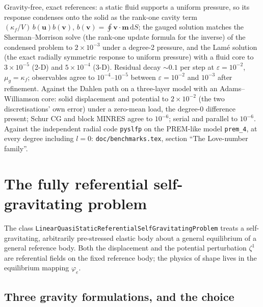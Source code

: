 \documentclass[11pt]{article}
\numberwithin{equation}{section}
\theoremstyle{remark}
\newcommand{\eps}{\varepsilon}
\newcommand{\dS}{\,\mathrm{d}S}
\newcommand{\vu}{\mathbf{u}}
\newcommand{\vv}{\mathbf{v}}
\newcommand{\vm}{\mathbf{m}}
\newcommand{\code}[1]{\texttt{#1}}
\begin{document}
Gravity-free, exact references: a static fluid supports a uniform pressure,
so its response condenses onto the solid as the rank-one cavity term
$(\kappa_f/V)\,b(\vu)b(\vv)$, $b(\vv) = \oint\vv\cdot\vm\dS$; the gauged
solution matches the Sherman--Morrison solve (the rank-one update formula
for the inverse) of the condensed problem to $2\times10^{-3}$ under a
degree-2 pressure, and the Lam\'e solution (the exact radially symmetric
response to uniform pressure) with a
fluid core to $3\times10^{-5}$ (2-D) and $5\times10^{-4}$ (3-D). Residual
decay $\sim0.1$ per step at $\eps = 10^{-2}$, $\mu_g = \kappa_f$;
observables agree to $10^{-4}$--$10^{-5}$ between $\eps = 10^{-2}$ and
$10^{-3}$ after refinement. Against the Dahlen path on a three-layer model
with an Adams--Williamson core: solid displacement and potential to
$2\times10^{-2}$ (the two discretisations' own error) under a zero-mean
load, the degree-0 difference present; Schur CG and block MINRES agree to
$10^{-6}$; serial and parallel to $10^{-6}$. Against the independent radial
code \code{pyslfp} on the PREM-like model \code{prem\_4}, at every degree
including $l = 0$: \code{doc/benchmarks.tex}, section ``The Love-number
family''.

\section{The fully referential self-gravitating problem}
\label{sec:referential}

The class \code{LinearQuasiStaticReferentialSelfGravitatingProblem} treats
a self-gravitating, arbitrarily pre-stressed elastic body about a general
equilibrium of a general reference body. Both the displacement and the
potential perturbation $\zeta^1$ are referential fields on the fixed
reference body; the physics of shape lives in the equilibrium mapping
$\varphi_e$.

\subsection{Three gravity formulations, and the choice}
\end{document}
